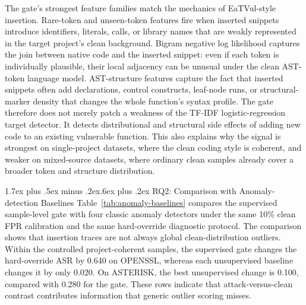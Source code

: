 \documentclass[letterpaper,twocolumn,10pt,twoside]{article}
\makeatletter
\renewcommand\subsection{\@startsection{subsection}{2}{\z@}%
  {1.7ex plus .5ex minus .2ex}{.6ex plus .2ex}%
  {\normalfont\normalsize\bfseries}}
\newcommand{\gate}{sample-level gate}
\newcommand{\asrshort}{ASR}
\newcommand{\dataset}[1]{\textsc{#1}}
\makeatother
\begin{document}
The gate's strongest feature families match the mechanics of EaTVul-style insertion. Rare-token and unseen-token features fire when inserted snippets introduce identifiers, literals, calls, or library names that are weakly represented in the target project's clean background. Bigram negative log likelihood captures the join between native code and the inserted snippet: even if each token is individually plausible, their local adjacency can be unusual under the clean AST-token language model. AST-structure features capture the fact that inserted snippets often add declarations, control constructs, leaf-node runs, or structural-marker density that changes the whole function's syntax profile. The gate therefore does not merely patch a weakness of the TF-IDF logistic-regression target detector. It detects distributional and structural side effects of adding new code to an existing vulnerable function. This also explains why the signal is strongest on single-project datasets, where the clean coding style is coherent, and weaker on mixed-source datasets, where ordinary clean samples already cover a broader token and structure distribution.

\subsection{RQ2: Comparison with Anomaly-detection Baselines}
Table~\ref{tab:anomaly-baselines} compares the supervised \gate{} with four classic anomaly detectors under the same 10\% clean FPR calibration and the same hard-override diagnostic protocol. The comparison shows that insertion traces are not always global clean-distribution outliers. Within the controlled project-coherent samples, the supervised gate changes the hard-override \asrshort{} by 0.640 on \dataset{OPENSSL}, whereas each unsupervised baseline changes it by only 0.020. On \dataset{ASTERISK}, the best unsupervised change is 0.100, compared with 0.280 for the gate. These rows indicate that attack-versus-clean contrast contributes information that generic outlier scoring misses.
\end{document}
